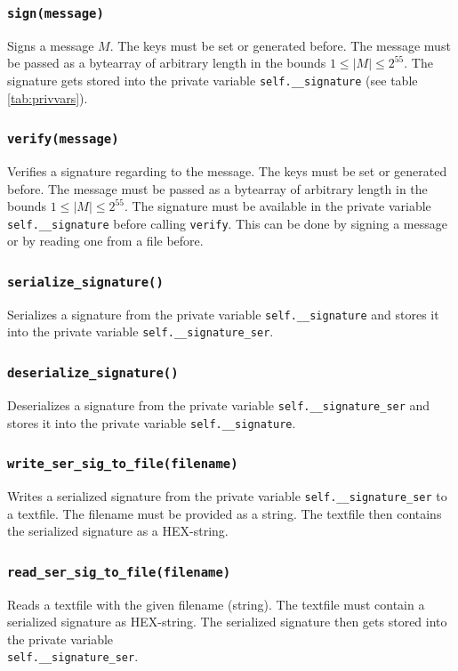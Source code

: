 \documentclass[]{article}
\begin{document}
\subsubsection{\texttt{sign(message)}}
Signs a message $M$. The keys must be set or generated before. The message must be passed as a bytearray of arbitrary length in the bounds $1 \leq \vert M \vert \leq 2^{55}$. The signature gets stored into the private variable \texttt{self.\_\_signature} (see table \ref{tab:privvars}). 
\subsubsection{\texttt{verify(message)}}
Verifies a signature regarding to the message. The keys must be set or generated before. The message must be passed as a bytearray of arbitrary length in the bounds $1 \leq \vert M \vert \leq 2^{55}$. The signature must be available in the private variable \texttt{self.\_\_signature} before calling \texttt{verify}. This can be done by signing a message or by reading one from a file before.
\subsubsection{\texttt{serialize\_signature()}}
Serializes a signature from the private variable \texttt{self.\_\_signature} and stores it into the private variable \texttt{self.\_\_signature\_ser}.
\subsubsection{\texttt{deserialize\_signature()}}
Deserializes a signature from the private variable \texttt{self.\_\_signature\_ser} and stores it into the private variable \texttt{self.\_\_signature}.
\subsubsection{\texttt{write\_ser\_sig\_to\_file(filename)}}
Writes a serialized signature from the private variable \texttt{self.\_\_signature\_ser} to a textfile. The filename must be provided as a string. The textfile then contains the serialized signature as a HEX-string.
\subsubsection{\texttt{read\_ser\_sig\_to\_file(filename)}}
Reads a textfile with the given filename (string). The textfile must contain a serialized signature as HEX-string. The serialized signature then gets stored into the private variable \\ \texttt{self.\_\_signature\_ser}.
\end{document}
